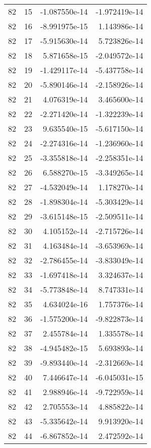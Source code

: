 \begin{tabular}{rrrr}
  82 &   15 & -1.087550e-14 & -1.972419e-14 \\
  82 &   16 & -8.991975e-15 &  1.143986e-14 \\
  82 &   17 & -5.915630e-14 &  5.723826e-14 \\
  82 &   18 &  5.871658e-15 & -2.049572e-14 \\
  82 &   19 & -1.429117e-14 & -5.437758e-14 \\
  82 &   20 & -5.890146e-14 & -2.158926e-14 \\
  82 &   21 &  4.076319e-14 &  3.465600e-14 \\
  82 &   22 & -2.271420e-14 & -1.322239e-14 \\
  82 &   23 &  9.635540e-15 & -5.617150e-14 \\
  82 &   24 & -2.274316e-14 & -1.236960e-14 \\
  82 &   25 & -3.355818e-14 & -2.258351e-14 \\
  82 &   26 &  6.588270e-15 & -3.349265e-14 \\
  82 &   27 & -4.532049e-14 &  1.178270e-14 \\
  82 &   28 & -1.898304e-14 & -5.303429e-14 \\
  82 &   29 & -3.615148e-15 & -2.509511e-14 \\
  82 &   30 &  4.105152e-14 & -2.715726e-14 \\
  82 &   31 &  4.163484e-14 & -3.653969e-14 \\
  82 &   32 & -2.786455e-14 & -3.833049e-14 \\
  82 &   33 & -1.697418e-14 &  3.324637e-14 \\
  82 &   34 & -5.773848e-14 &  8.747331e-14 \\
  82 &   35 &  4.634024e-16 &  1.757376e-14 \\
  82 &   36 & -1.575200e-14 & -9.822873e-14 \\
  82 &   37 &  2.455784e-14 &  1.335578e-14 \\
  82 &   38 & -4.945482e-15 &  5.693893e-14 \\
  82 &   39 & -9.893440e-14 & -2.312669e-14 \\
  82 &   40 &  7.446647e-14 & -6.045031e-15 \\
  82 &   41 &  2.988946e-14 & -9.722959e-14 \\
  82 &   42 &  2.705553e-14 &  4.885822e-14 \\
  82 &   43 & -5.335642e-14 &  9.913920e-14 \\
  82 &   44 & -6.867852e-14 &  2.472592e-14 \\

\end{tabular}
